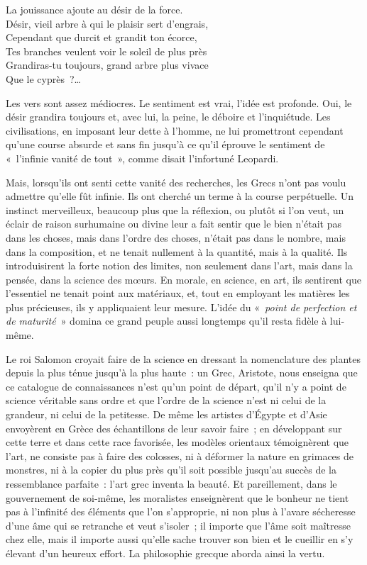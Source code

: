 \documentclass[french,twoside]{book} %
\newenvironment{quoteblock}%
  {\begin{quoting}}
  {\end{quoting}}
\newenvironment{quotebar}{%
    \def\FrameCommand{{\color{rubric!10!}\vrule width 0.5em} \hspace{0.9em}}%
    \def\OuterFrameSep{\itemsep} %
    \MakeFramed {\advance\hsize-\width \FrameRestore}
  }%
  {%
    \endMakeFramed
  }
\renewenvironment{quoteblock}%
  {%
    \savenotes
    \setstretch{0.9}
    \normalfont
    \begin{quotebar}
  }
  {%
    \end{quotebar}
    \spewnotes
  }
\begin{document}
\begin{quoteblock}
 \noindent La jouissance ajoute au désir de la force. \\
Désir, vieil arbre à qui le plaisir sert d’engrais, \\
Cependant que durcit et grandit ton écorce, \\
Tes branches veulent voir le soleil de plus près \\
Grandiras-tu toujours, grand arbre plus vivace \\
Que le cyprès ?…
 \end{quoteblock}

\noindent Les vers sont assez médiocres. Le sentiment est vrai, l’idée est profonde. Oui, le désir grandira toujours et, avec lui, la peine, le déboire et l’inquiétude. Les civilisations, en imposant leur dette à l’homme, ne lui promettront cependant qu’une course absurde et sans fin jusqu’à ce qu’il éprouve le sentiment de « l’infinie vanité de tout », comme disait l’infortuné Leopardi.\par
Mais, lorsqu’ils ont senti cette vanité des recherches, les Grecs n’ont pas voulu admettre qu’elle fût infinie. Ils ont cherché un terme à la course perpétuelle. Un instinct merveilleux, beaucoup plus que la réflexion, ou plutôt si l’on veut, un éclair de raison surhumaine ou divine leur a fait sentir que le bien n’était pas dans les choses, mais dans l’ordre des choses, n’était pas dans le nombre, mais dans la composition, et ne tenait nullement à la quantité, mais à la qualité. Ils introduisirent la forte notion des limites, non seulement dans l’art, mais dans la pensée, dans la science des mœurs. En morale, en science, en art, ils sentirent que l’essentiel ne tenait point aux matériaux, et, tout en employant les matières les plus précieuses, ils y appliquaient leur mesure. L’idée du « \emph{point de perfection et de maturité} » domina ce grand peuple aussi longtemps qu’il resta fidèle à lui-même.\par
Le roi Salomon croyait faire de la science en dressant la nomenclature des plantes depuis la plus ténue jusqu’à la plus haute : un Grec, Aristote, nous enseigna que ce catalogue de connaissances n’est qu’un point de départ, qu’il n’y a point de science véritable sans ordre et que l’ordre de la science n’est ni celui de la grandeur, ni celui de la petitesse. De même les artistes d’Égypte et d’Asie envoyèrent en Grèce des échantillons de leur savoir faire ; en développant sur cette terre et dans cette race favorisée, les modèles orientaux témoignèrent que l’art, ne consiste pas à faire des colosses, ni à déformer la nature en grimaces de monstres, ni à la copier du plus près qu’il soit possible jusqu’au succès de la ressemblance parfaite : l’art grec inventa la beauté. Et pareillement, dans le gouvernement de soi-même, les moralistes enseignèrent que le bonheur ne tient pas à l’infinité des éléments que l’on s’approprie, ni non plus à l’avare sécheresse d’une âme qui se retranche et veut s’isoler ; il importe que l’âme soit maîtresse chez elle, mais il importe aussi qu’elle sache trouver son bien et le cueillir en s’y élevant d’un heureux effort. La philosophie grecque aborda ainsi la vertu.\par
\end{document}

